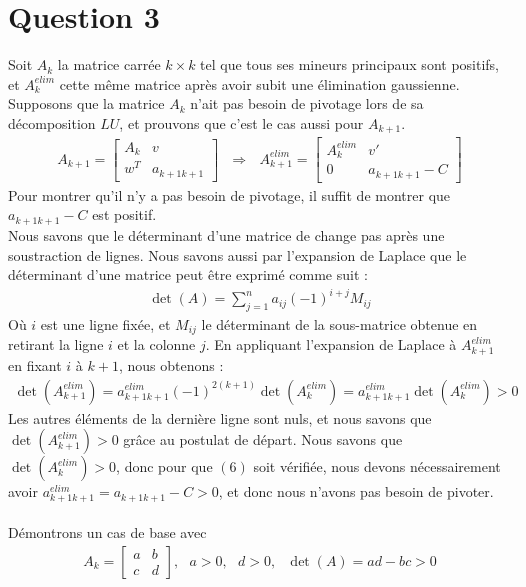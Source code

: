 \documentclass[11pt]{article}
\begin{document}
\section*{Question 3}
Soit $A_k$ la matrice carrée $k\times k$ tel que tous ses mineurs principaux sont positifs, et $A_k^{elim}$ cette même matrice après avoir subit une élimination gaussienne.\\
Supposons que la matrice $A_k$ n'ait pas besoin de pivotage lors de sa décomposition $LU$, et prouvons que c'est le cas aussi pour $A_{k+1}$.\\
\begin{align}
    A_{k+1} = \left[\begin{array}{cc}
        A_k & v\\
        w^T & a_{k+1k+1}
    \end{array}\right] ~~~ \Rightarrow ~~~
    A_{k+1}^{elim} = \left[\begin{array}{cc}
        A_k^{elim} & v'\\
        0 & a_{k+1k+1} - C
    \end{array}\right]
\end{align}
Pour montrer qu'il n'y a pas besoin de pivotage, il suffit de montrer que $a_{k+1k+1} - C$ est positif.\\
Nous savons que le déterminant d'une matrice de change pas après une soustraction de lignes. Nous savons aussi par l'expansion de Laplace que le déterminant d'une matrice peut être exprimé comme suit :
\begin{align}
    \det(A) = \sum_{j=1}^{n}a_{ij}(-1)^{i+j}M_{ij}
\end{align}
Où $i$ est une ligne fixée, et $M_{ij}$ le déterminant de la sous-matrice obtenue en retirant la ligne $i$ et la colonne $j$. En appliquant l'expansion de Laplace à $A_{k+1}^{elim}$ en fixant $i$ à $k+1$, nous obtenons :
\begin{align}
    \det(A_{k+1}^{elim}) = a^{elim}_{k+1k+1}(-1)^{2(k+1)}\det(A_k^{elim}) = a^{elim}_{k+1k+1}\det(A_k^{elim}) > 0
\end{align}
Les autres éléments de la dernière ligne sont nuls, et nous savons que $\det(A_{k+1}^{elim}) > 0$ grâce au postulat de départ. Nous savons que $\det(A_k^{elim}) > 0$, donc pour que $(6)$ soit vérifiée, nous devons nécessairement avoir $a^{elim}_{k+1k+1} = a_{k+1k+1} - C > 0$, et donc nous n'avons pas besoin de pivoter.\\\\
Démontrons un cas de base avec
\begin{align}
    A_k = \left[\begin{array}{cc}
        a & b\\
        c & d
    \end{array}\right], ~~~ a > 0, ~~~ d > 0, ~~~ \det(A) = ad - bc > 0
\end{align}
\end{document}
